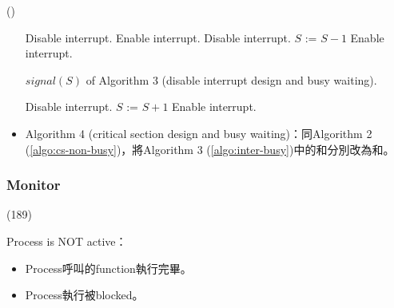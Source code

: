 \begin{theorem}{()}
\begin{itemize}
\begin{algorithm}[H]
            \begin{algorithmic}[1]
                    \State Disable interrupt.
                        \State Enable interrupt.
                        \State Disable interrupt.
                    \EndWhile
                    \State $S$ := $S - 1$ 
                    \State Enable interrupt.
                \EndFunction
            \end{algorithmic}
        \end{algorithm}
        \begin{algorithm}[H]
            \caption{$signal(S)$ of Algorithm 3 (disable interrupt design and busy waiting).}
            \begin{algorithmic}[1]
                    \State Disable interrupt.
                    \State $S$ := $S + 1$
                    \State Enable interrupt.
                \EndFunction
            \end{algorithmic}
        \end{algorithm}
        \item Algorithm 4 (critical section design and busy waiting)：同Algorithm 2 (\ref{algo:cs-non-busy})，將Algorithm 3 (\ref{algo:inter-busy})中的和分別改為和。
    \end{itemize}
\end{theorem}

\subsubsection{Monitor}

\begin{theorem}{(189)} 
    \item Process is NOT active：\begin{itemize}
        \item Process呼叫的function執行完畢。
        \item Process執行被blocked。
    \end{itemize}
\end{theorem}


